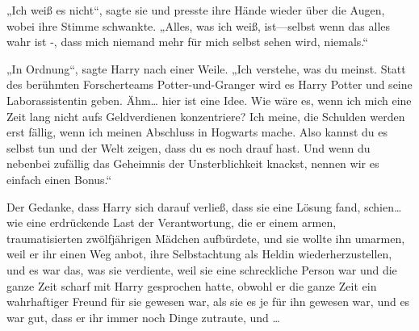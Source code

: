 „Ich weiß es nicht“, sagte sie und presste ihre Hände wieder über die Augen, wobei ihre Stimme schwankte. „Alles, was ich weiß, ist—selbst wenn das alles wahr ist -, dass mich niemand mehr für mich selbst sehen wird, niemals.“

„In Ordnung“, sagte Harry nach einer Weile. „Ich verstehe, was du meinst. Statt des berühmten Forscherteams Potter-und-Granger wird es Harry Potter und seine Laborassistentin geben. Ähm… hier ist eine Idee. Wie wäre es, wenn ich mich eine Zeit lang nicht aufs Geldverdienen konzentriere? Ich meine, die Schulden werden erst fällig, wenn ich meinen Abschluss in Hogwarts mache. Also kannst du es selbst tun und der Welt zeigen, dass du es noch drauf hast. Und wenn du nebenbei zufällig das Geheimnis der Unsterblichkeit knackst, nennen wir es einfach einen Bonus.“

Der Gedanke, dass Harry sich darauf verließ, dass sie eine Lösung fand, schien…wie eine erdrückende Last der Verantwortung, die er einem armen, traumatisierten zwölfjährigen Mädchen aufbürdete, und sie wollte ihn umarmen, weil er ihr einen Weg anbot, ihre Selbstachtung als Heldin wiederherzustellen, und es war das, was sie verdiente, weil sie eine schreckliche Person war und die ganze Zeit scharf mit Harry gesprochen hatte, obwohl er die ganze Zeit ein wahrhaftiger Freund für sie gewesen war, als sie es je für ihn gewesen war, und es war gut, dass er ihr immer noch Dinge zutraute, und …

